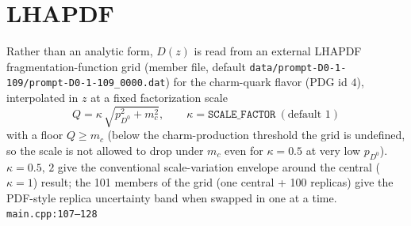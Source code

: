 \documentclass[11pt]{article}
\newcommand{\code}[1]{\texttt{#1}}
\begin{document}
\section{LHAPDF}
Rather than an analytic form, $D(z)$ is read from an external LHAPDF fragmentation-function grid (member file, default \code{data/prompt-D0-1-109/prompt-D0-1-109\_0000.dat}) for the charm-quark flavor (PDG id $4$), interpolated in $z$ at a fixed factorization scale
\begin{equation}
  Q = \kappa\,\sqrt{p_{D^0}^2+m_c^2}, \qquad \kappa=\texttt{SCALE\_FACTOR}\ (\text{default }1)
\end{equation}
with a floor $Q\ge m_c$ (below the charm-production threshold the grid is undefined, so the scale is not allowed to drop under $m_c$ even for $\kappa=0.5$ at very low $p_{D^0}$). $\kappa=0.5,\,2$ give the conventional scale-variation envelope around the central ($\kappa=1$) result; the 101 members of the grid (one central + 100 replicas) give the PDF-style replica uncertainty band when swapped in one at a time.
\hfill{\footnotesize\code{main.cpp:107--128}}
\end{document}

